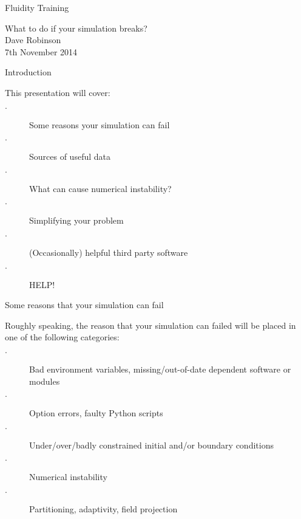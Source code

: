 \documentclass[professionalfonts, 8pt]{beamer}
\begin{document}

\begin{frame}{Fluidity Training}
  \begin{center}
  {\Huge What to do if your simulation breaks?}
  \vspace{1.5cm}\\
  \large Dave Robinson\\
  \vspace{0.2cm}
  7th November 2014
  \end{center}
\end{frame}

\begin{frame}{Introduction}

This presentation will cover:
\vspace{1ex}
\begin{description}
 \item[$\cdot$] Some reasons your simulation can fail
 \item[$\cdot$] Sources of useful data
 \item[$\cdot$] What can cause numerical instability?
 \item[$\cdot$] Simplifying your problem
 \item[$\cdot$] (Occasionally) helpful third party software 
 \item[$\cdot$] HELP!
\end{description}
\end{frame}


\begin{frame}{Some reasons that your simulation can fail}

Roughly speaking, the reason that your simulation can failed will be placed in one of the following categories:
\vspace{1ex}

\begin{description}
 \item[$\cdot$] Bad environment variables, missing/out-of-date dependent software or modules
 \item[$\cdot$] Option errors, faulty Python scripts
 \item[$\cdot$] Under/over/badly constrained initial and/or boundary conditions
 \item[$\cdot$] Numerical instability
 \item[$\cdot$] Partitioning, adaptivity, field projection
\end{description}

\end{frame}
\end{document}
